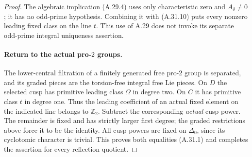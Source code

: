 \begin{proof}
The algebraic implication (A.29.4) uses only
characteristic zero and \(A_\delta\ne0\);
it has no odd-prime hypothesis. Combining it
with (A.31.10) puts every nonzero leading fixed
class on the line \(t\).
This use of A.29 does not invoke its separate
odd-prime integral uniqueness assertion.

\paragraph{Return to the actual pro-\(2\) groups.}
The lower-central filtration of a finitely generated
free pro-\(2\) group is separated, and its graded
pieces are the torsion-free integral free Lie
pieces. On \(D\) the selected cusp has primitive
leading class \(\Omega\) in degree two.
On \(C\) it has primitive class \(t\) in degree one.
Thus the leading coefficient of an actual fixed
element on the indicated line belongs to
\(\mathbb Z_2\). Subtract the corresponding
\emph{actual} cusp power. The remainder is fixed
and has strictly larger first degree; the
graded restrictions above force it to be the
identity. All cusp powers are fixed on
\(\Delta_0\), since its cyclotomic character is
trivial. This proves both equalities (A.31.1)
and completes the assertion for every reflection
quotient.
\end{proof}
